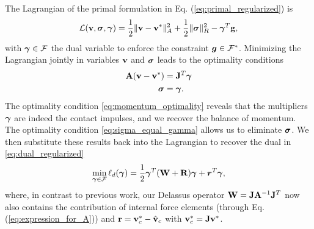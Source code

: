 The Lagrangian of the primal formulation in Eq. (\ref{eq:primal_regularized}) is
\begin{equation}
    \mathcal{L}({\mathbf{v}},{\bm\sigma},{\bm{\gamma}}) = 
\frac{1}{2}\Vert{\mathbf{v}}-{\mathbf{v}}^*\Vert_A^2 + \frac{1}{2} \Vert{\bm\sigma}\Vert_{R}^2 - {\bm{\gamma}}^T{\mathbf{g}},
\end{equation}
with ${\bm{\gamma}}\in\mathcal{F}$ the dual variable to enforce the constraint
${\bm{g}}\in \mathcal{F}^*$. Minimizing the Lagrangian jointly in variables ${\mathbf{v}}$ and ${\bm\sigma}$ leads
to the optimality conditions
\begin{subequations}\label{eq:primal_optimality_conditions}
\begin{align}
    \mf{A}(\mf{v}-\mf{v}^*) &= \mf{J}^T\vf{\gamma} \label{eq:momentum_optimality}\\
    \vf{\sigma} &= \vf{\gamma}.  \label{eq:sigma_equal_gamma}
\end{align}
\end{subequations}
The optimality condition \eqref{eq:momentum_optimality} reveals that the
multipliers ${\bm\gamma}$ are indeed the contact impulses, and we recover the
balance of momentum. The optimality condition \eqref{eq:sigma_equal_gamma}
allows us to eliminate ${\bm{\sigma}}$. We then substitute these results back into
the Lagrangian to recover the dual in
\eqref{eq:dual_regularized}
\begin{align*}
    \min_{{\bm\gamma}\in \mathcal{F}} \ell_d({\bm\gamma}) =
    \frac{1}{2}{\bm\gamma}^T(\mathbf{W}+\mathbf{R}){\bm\gamma} + {\bm r}^T
    {\bm\gamma},
\end{align*}
where, in contrast to previous work, our Delassus operator
${\mathbf{W}}={\mathbf{J}}{\mathbf{A}}^{-1}{\mathbf{J}}^T$ now also contains the contribution of
internal force elements (through Eq. (\ref{eq:expression_for_A})) and
${\mathbf{r}}={\mathbf{v}}_c^*-\hat{{\mathbf{v}}}_c$ with
${\mathbf{v}}_c^*={\mathbf{J}}{\mathbf{v}}^*$.\hfill\IEEEQED
